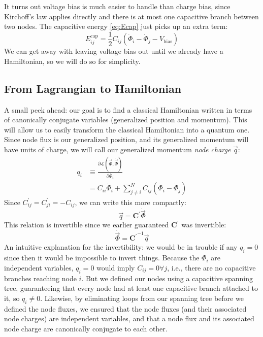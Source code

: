 It turns out voltage bias is much easier to handle than charge bias, since Kirchoff's law applies directly and there is at most one capacitive branch between two nodes. The capacitive energy \cref{eq:Ecap} just picks up an extra term:
\begin{equation}
\label{eq:Ecapbias}
E_{ij}^\mathrm{cap} = \frac{1}{2}C_{ij} \left(\dot{\Phi}_i - \dot{\Phi}_j - V_\mathrm{bias}\right)
\end{equation}
We can get away with leaving voltage bias out until we already have a Hamiltonian, so we will do so for simplicity.

\subsection{From Lagrangian to Hamiltonian}
\label{sec:circuitHfromL}
A small peek ahead: our goal is to find a classical Hamiltonian written in terms of canonically conjugate variables (generalized position and momentum). This will allow us to easily transform the classical Hamiltonian into a quantum one. Since node flux is our generalized position, and its generalized momentum will have units of charge, we will call our generalized momentum \textit{node charge} $\vec{q}$:
\begin{align}
    q_i &\equiv \frac{\partial\mathcal{L}(\vec\Phi,\dot{\vec{\Phi}})}{\partial\dot{\Phi_i}} \\
    &=C_{ii}\dot{\Phi}_i+\sum_{j\neq i}^N C_{ij}(\dot{\Phi}_i-\dot{\Phi}_j)
\end{align}
Since $C^\prime_{ij} = C^\prime_{ji}=-C_{ij}$, we can write this more compactly:
\begin{equation}
    \vec{q}=\mathbf{C^\prime}\dot{\vec{\Phi}}
\end{equation}
This relation is invertible since we earlier guaranteed $\mathbf{C^\prime}$ was invertible:
\begin{equation}
    \dot{\vec{\Phi}}= \mathbf{C^\prime}^{-1}\vec{q}
\end{equation}
An intuitive explanation for the invertibility: we would be in trouble if any $q_i = 0$ since then it would be impossible to invert things. Because the $\Phi_i$ are independent variables, $q_i = 0$ would imply $C_{ij} = 0 \forall j$, i.e., there are no capacitive branches reaching node $i$. But we defined our nodes using a capacitive spanning tree, guaranteeing that every node had at least one capacitive branch attached to it, so $q_i \neq 0$. Likewise, by eliminating loops from our spanning tree before we defined the node fluxes, we ensured that the node fluxes (and their associated node charges) are independent variables, and that a node flux and its associated node charge are canonically conjugate to each other.

